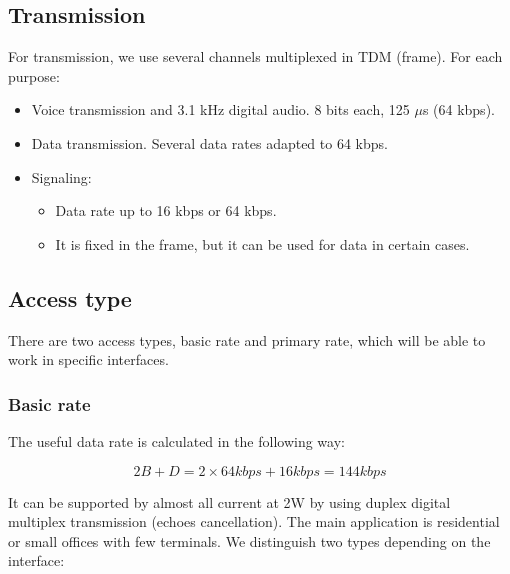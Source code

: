 \documentclass[
	12pt,
	twoside
]{book}
\begin{document}
\subsection{Transmission}

For transmission, we use several channels multiplexed in TDM (frame). For each purpose:

\begin{itemize}
	\item Voice transmission and 3.1 kHz digital audio. 8 bits each, 125 $\mu$s (64 kbps).
	\item Data transmission. Several data rates adapted to 64 kbps.
	\item {
		Signaling:
		\begin{itemize}
			\item Data rate up to 16 kbps or 64 kbps.
			\item It is fixed in the frame, but it can be used for data in certain cases.
		\end{itemize}
	}
\end{itemize}

\subsection{Access type}

There are two access types, basic rate and primary rate, which will be able to work in specific interfaces.

\subsubsection{Basic rate}

The useful data rate is calculated in the following way:

$$
	2B + D = 2 \times 64 kbps + 16 kbps = 144 kbps
$$

It can be supported by almost all current at 2W by using duplex digital multiplex transmission (echoes cancellation). The main application is residential or small offices with few terminals. We distinguish two types depending on the interface:
\end{document}
